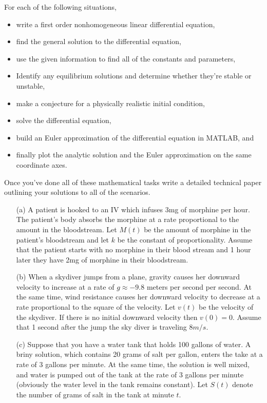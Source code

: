 \begin{problem}
    For each of the following situations, 
    \begin{itemize}
        \item write a first order nonhomogeneous linear differential equation, 
        \item find the general solution to the differential equation, 
        \item use the given information to find all of the constants and
            parameters,
        \item Identify any equilibrium solutions and determine whether they're stable or
            unstable,
        \item make a conjecture for a physically realistic initial condition,
        \item solve the differential equation,
        \item build an Euler approximation of the differential equation in MATLAB, and 
        \item finally plot the analytic solution and the Euler approximation on the same
            coordinate axes.
    \end{itemize}
    Once you've done all of these mathematical tasks write a detailed technical paper
    outlining your solutions to all of the scenarios.
    \begin{enumerate}
        \item[(a)] A patient is hooked to an IV which infuses 3mg of morphine per hour. The
            patient's body absorbs the morphine at a rate proportional to the amount in the bloodstream.
            Let $M(t)$ be the amount of morphine in the patient's bloodstream and let $k$ be
            the constant of proportionality. Assume that the patient starts with no
            morphine in their blood stream and 1 hour later they have 2mg of morphine in
            their bloodstream.
        \item[(b)] When a skydiver jumps from a plane, gravity causes her downward
            velocity to increase at a rate of $g \approx −9.8$ meters per second per second. At
            the same time, wind resistance causes her downward velocity to decrease at a
            rate proportional to the square of the velocity. Let $v(t)$ be the velocity of the skydiver.
            If there is no initial downward velocity then $v(0) = 0$. Assume that 1 second
            after the jump the sky diver is traveling $8m/s$.
        \item[(c)] Suppose that you have a water tank that holds 100 gallons of water. A
            briny solution, which contains 20 grams of salt per gallon, enters the take at
            a rate of 3 gallons per minute. At the same time, the solution is well mixed,
            and water is pumped out of the tank at the rate of 3 gallons per minute
            (obviously the water level in the tank remains constant). Let $S(t)$ denote the
            number of grams of salt in the tank at minute $t$.
    \end{enumerate}
\end{problem}




